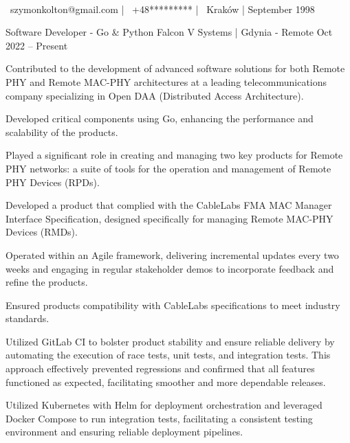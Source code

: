 \documentclass[]{awesome-cv}
\begin{document}
    
\begin{center}
	  \\
	\vspace{2mm}
	{\faEnvelope\ szymonkolton@gmail.com} | {\faMobile\ +48*********} | {\faMapMarker\ Kraków} | {September 1998}
\end{center}
\begin{cventries}

	\cventry
	{Software Developer - Go \& Python}
	{Falcon V Systems | }
	{Gdynia - Remote}
	{Oct 2022 – Present}
	{\begin{cvitems}
		\item {Contributed to the development of advanced software solutions for both Remote PHY and Remote MAC-PHY architectures at a leading telecommunications company specializing in Open DAA (Distributed Access Architecture).}
		\item {Developed critical components using Go, enhancing the performance and scalability of the products.}
		\item {Played a significant role in creating and managing two key products for Remote PHY networks: a suite of tools for the operation and management of Remote PHY Devices (RPDs).}
		\item {Developed a product that complied with the CableLabs FMA MAC Manager Interface Specification, designed specifically for managing Remote MAC-PHY Devices (RMDs).}
		\item {Operated within an Agile framework, delivering incremental updates every two weeks and engaging in regular stakeholder demos to incorporate feedback and refine the products.}
		\item {Ensured products compatibility with CableLabs specifications to meet industry standards.}
		\item {Utilized GitLab CI to bolster product stability and ensure reliable delivery by automating the execution of race tests, unit tests, and integration tests. This approach effectively prevented regressions and confirmed that all features functioned as expected, facilitating smoother and more dependable releases.}
		\item {Utilized Kubernetes with Helm for deployment orchestration and leveraged Docker Compose to run integration tests, facilitating a consistent testing environment and ensuring reliable deployment pipelines.}

\end{cvitems}}
\end{cventries}
\end{document}
